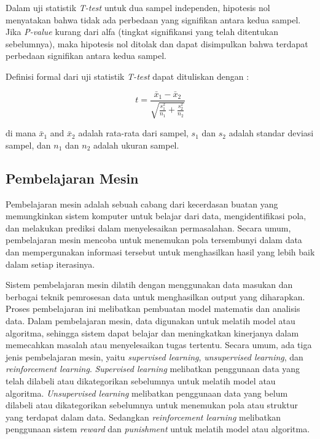 Dalam uji statistik \emph{T-test} untuk dua sampel independen, hipotesis nol menyatakan bahwa tidak ada perbedaan yang signifikan antara kedua sampel. Jika
\emph{P-value} kurang dari alfa (tingkat signifikansi yang telah ditentukan sebelumnya), maka hipotesis nol ditolak dan dapat disimpulkan bahwa terdapat
perbedaan signifikan antara kedua sampel. \cite{kumar}

\noindent Definisi formal dari uji statistik \emph{T-test} dapat dituliskan dengan \cite{kumar}:

\begin{equation}
	t = \frac{\bar{x}_1 - \bar{x}_2}{\sqrt{\frac{s_1^2}{n_1} + \frac{s_2^2}{n_2}}}
\end{equation}

di mana $\bar{x}_1$ and $\bar{x}_2$ adalah rata-rata dari sampel, $s_1$ dan $s_2$ adalah standar deviasi sampel, dan $n_1$ dan $n_2$ adalah ukuran sampel.

\subsection{Pembelajaran Mesin}
Pembelajaran mesin adalah sebuah cabang dari kecerdasan buatan yang memungkinkan sistem komputer untuk belajar dari data, mengidentifikasi pola, dan melakukan
prediksi dalam menyelesaikan permasalahan. Secara umum, pembelajaran mesin mencoba untuk menemukan pola tersembunyi dalam data dan mempergunakan informasi
tersebut untuk menghasilkan hasil yang lebih baik dalam setiap iterasinya.

Sistem pembelajaran mesin dilatih dengan menggunakan data masukan dan berbagai teknik pemrosesan data untuk menghasilkan output yang diharapkan. Proses
pembelajaran ini melibatkan pembuatan model matematis dan analisis data. Dalam pembelajaran mesin, data digunakan untuk melatih model atau algoritma, sehingga
sistem dapat belajar dan meningkatkan kinerjanya dalam memecahkan masalah atau menyelesaikan tugas tertentu. Secara umum, ada tiga jenis pembelajaran mesin,
yaitu \emph{supervised learning}, \emph{unsupervised learning}, dan \emph{reinforcement learning}. \emph{Supervised learning} melibatkan penggunaan data yang
telah dilabeli atau dikategorikan sebelumnya untuk melatih model atau algoritma. \emph{Unsupervised learning} melibatkan penggunaan data yang belum dilabeli
atau dikategorikan sebelumnya untuk menemukan pola atau struktur yang terdapat dalam data. Sedangkan \emph{reinforcement learning} melibatkan penggunaan sistem
\emph{reward} dan \emph{punishment} untuk melatih model atau algoritma.

